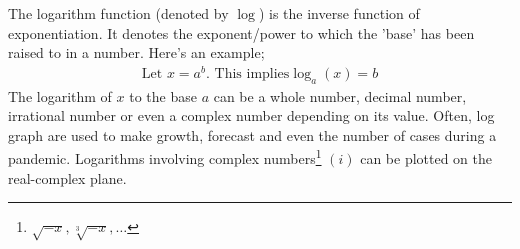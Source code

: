 \documentclass{article}
\begin{document}
\begin{mathbox}
The {logarithm} function (denoted by $\log$) is the {inverse} function of {exponentiation}. It denotes the {exponent/power} to which the {'base'} has been raised to in a number. Here's an example;
\begin{align*}
    \text{Let } x = a^b. \text{ This implies} \log_a (x) = b
\end{align*}
The logarithm of $x$ to the base $a$ can be a {whole number, decimal number, irrational number} or even a {complex number} depending on its value. Often, log graph are used to make growth, forecast and even the number of cases during a pandemic. Logarithms involving complex numbers\footnote{\sffamily${\sqrt{-x}, \sqrt[3]{-x}, \dots}$} $(i)$ can be plotted on the real-complex plane.
\end{mathbox}
\end{document}
